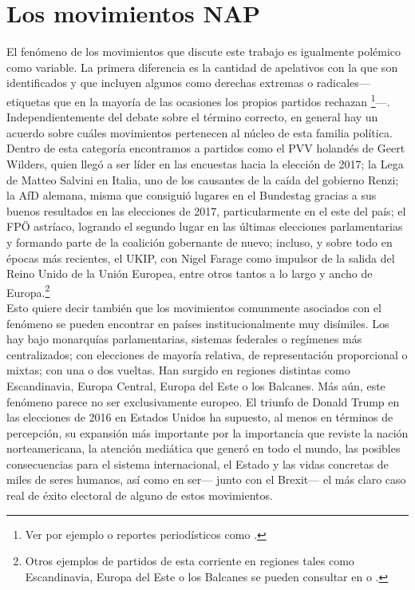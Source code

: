 \chapter{Los movimientos NAP}

El fenómeno de los movimientos que discute este trabajo es igualmente polémico como variable. La primera diferencia es la cantidad de apelativos con la que son identificados y que incluyen algunos como derechas extremas o radicales--- etiquetas que en la mayoría de las ocasiones los propios partidos rechazan \footnote{Ver por ejemplo \textcite[8]{Hainsworth16a} o reportes periodísticos como \textcite{LeParisien13,Sputnik17}.}---. Independientemente del debate sobre el término correcto, en general hay un acuerdo sobre cuáles movimientos pertenecen al núcleo de esta familia política. Dentro de esta categoría encontramos a partidos como el PVV holandés de Geert Wilders, quien llegó a ser líder en las encuestas hacia la elección de 2017; la Lega de Matteo Salvini en Italia, uno de los causantes de la caída del gobierno Renzi; la AfD alemana, misma que consiguió lugares en el Bundestag gracias a sus buenos resultados en las elecciones de 2017, particularmente en el este del país; el FPÖ astríaco, logrando el segundo lugar en las últimas elecciones parlamentarias y formando parte de la coalición gobernante de nuevo; incluso, y sobre todo en épocas más recientes, el UKIP, con Nigel Farage como impulsor de la salida del Reino Unido de la Unión Europea, entre otros tantos a lo largo y ancho de Europa.\footnote{Otros ejemplos de partidos de esta corriente en regiones tales como Escandinavia, Europa del Este o los Balcanes se pueden consultar  en \textcite{Mammone12} o \textcite{Hainsworth16a}.}\\ 

Esto quiere decir también que los movimientos comunmente asociados con el fenómeno se pueden encontrar en países institucionalmente muy disímiles. Los hay bajo monarquías parlamentarias, sistemas federales o regímenes más centralizados; con elecciones de mayoría relativa, de representación proporcional o mixtas; con una o dos vueltas. Han surgido en regiones distintas como Escandinavia, Europa Central, Europa del Este o los Balcanes. Más aún, este fenómeno parece no ser exclusivamente europeo. El triunfo de Donald Trump en las elecciones de 2016 en Estados Unidos ha supuesto, al menos en términos de percepción, su expansión más importante por la importancia que reviste la nación norteamericana, la atención mediática que generó en todo el mundo, las posibles consecuencias para el sistema internacional, el Estado y las vidas concretas de miles de seres humanos, así como en ser--- junto con el Brexit--- el más claro caso real de éxito electoral de alguno de estos movimientos.\\ 

